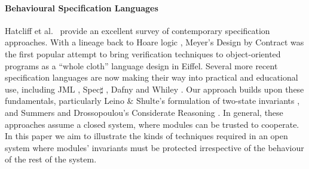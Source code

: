 \paragraph{Behavioural Specification Languages} 

Hatcliff et al.\ \cite{behavSurvey2012} provide an excellent survey of
contemporary specification approaches.  With a lineage back to Hoare
logic \cite{Hoare69}, Meyer's Design by Contract \cite{Meyer97} was the
first popular attempt to bring verification techniques to
object-oriented programs as a ``whole cloth'' language design in
Eiffel.  Several more recent specification languages are now making
their way into practical and educational use, including JML
\cite{Leavens-etal07}, Spec$\sharp$ \cite{BarLeiSch05}, Dafny
\cite{dafny} and Whiley \cite{whiley15}. Our approach builds upon
these fundamentals, particularly Leino \& Shulte's
formulation of
two-state invariants \cite{usingHistory}, and Summers and
Drossopoulou's Considerate Reasoning \cite{Considerate}.
%
In general, these approaches assume a closed system, where modules
can be trusted to cooperate. In this paper we aim to illustrate
the kinds of techniques required in an open system where modules'
invariants must be protected irrespective of the behaviour of the rest
of the system.




